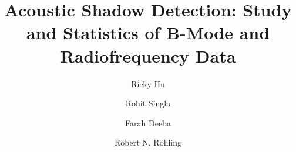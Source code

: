 \documentclass[preprint,5p,authoryear]{elsarticle}
\begin{document}
\begin{frontmatter}



\title{Acoustic Shadow Detection: Study and Statistics of B-Mode and Radiofrequency Data}






\author[Affil1]{Ricky Hu }
\author[Affil1]{Rohit Singla}
\author[Affil1]{Farah Deeba}
\author[Affil1][Affil2]{Robert N. Rohling}

\address[Affil1]{Department of Electrical and Computer Engineering, University of British Columbia, Vancouver, Canada}
\address[Affil2]{Department of Mechanical Engineering, University of British Columbia, Vancouver, Canada}



\end{frontmatter}
\end{document}
